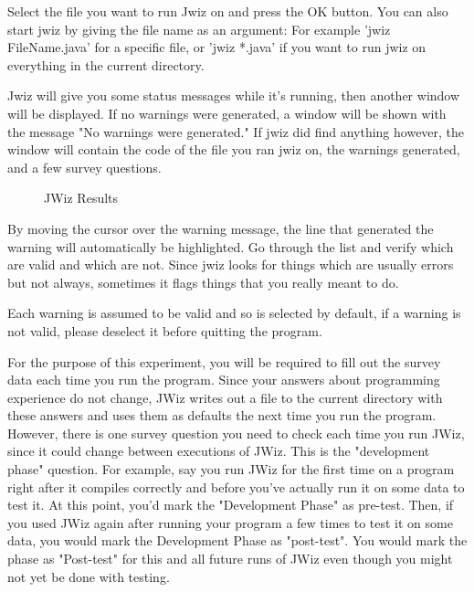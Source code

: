       Select the file you want to run Jwiz on and press the OK button.
      You can also start jwiz by giving the file name as an argument: For
      example 'jwiz FileName.java' for a specific file, or 'jwiz *.java' if
      you want to run jwiz on everything in the current directory.

      Jwiz will give you some status messages while it's running, then
      another window will be displayed.  If no warnings were generated, a
      window will be shown with the message "No warnings were generated."
      If jwiz did find anything however, the window will contain the code
      of the file you ran jwiz on, the warnings generated, and a few survey 
      questions.

      \begin{figure}[htb] 
        {\centerline{}}
        \caption{\label{HandoutExample2} JWiz Results}
      \end{figure}

      By moving the cursor over the warning message, the line that
      generated the warning will automatically be highlighted.  Go through
      the list and verify which are valid and which
      are not.  Since jwiz looks for things which are usually errors but not
      always, sometimes it flags things that you really meant to do.

      Each warning is assumed to be valid and so is selected by default,
      if a warning is not valid, please deselect it before quitting the
      program.

      For the purpose of this experiment, you will be
      required to fill out the survey data each time you run
      the program. Since your answers about programming
      experience do not change, JWiz writes out a file to
      the current directory with these answers and uses them
      as defaults the next time you run the
      program. However, there is one survey question you
      need to check each time you run JWiz, since it could
      change between executions of JWiz. This is the "development phase"
      question. For example, say you run JWiz for the
      first time on a program right after it compiles
      correctly and before you've actually run it on some
      data to test it.  At this point, you'd mark the
      "Development Phase" as pre-test.  Then, if you used
      JWiz again after running your program a few times to
      test it on some data, you would mark the Development
      Phase as "post-test".  You would mark the phase as
      "Post-test" for this and all future runs of JWiz even
      though you might not yet be done with testing.

